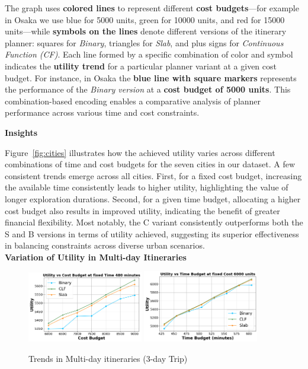 \noindent The graph uses \textbf{colored lines} to represent different \textbf{cost budgets}—for example in Osaka we use blue for 5000 units, green for 10000 units, and red for 15000 units—while \textbf{symbols on the lines} denote different versions of the itinerary planner: squares for \textit{Binary}, triangles for \textit{Slab}, and plus signs for \textit{Continuous Function (CF)}. Each line formed by a specific combination of color and symbol indicates the \textbf{utility trend} for a particular planner variant at a given cost budget. For instance, in Osaka the \textbf{blue line with square markers} represents the performance of the \textit{Binary version} at a \textbf{cost budget of 5000 units}. This combination-based encoding enables a comparative analysis of planner performance across various time and cost constraints.

\noindent\textbf{Insights}

\noindent Figure~\ref{fig:cities} illustrates how the achieved utility varies across different combinations of time and cost budgets for the seven cities in our dataset. A few consistent trends emerge across all cities. First, for a fixed cost budget, increasing the available time consistently leads to higher utility, highlighting the value of longer exploration durations. Second, for a given time budget, allocating a higher cost budget also results in improved utility, indicating the benefit of greater financial flexibility. Most notably, the C variant consistently outperforms both the S and B versions in terms of utility achieved, suggesting its superior effectiveness in balancing constraints across diverse urban scenarios.\\

\noindent\textbf{Variation of Utility in Multi-day Itineraries}
\begin{figure}[H]
\includegraphics[width=0.45\textwidth]{plots/multiday1_pkj.png}
\includegraphics[width=0.45\textwidth]{plots/multiday2_pkj.png}
\caption{Trends in Multi-day itineraries (3-day Trip)}
\label{fig:util_md}
\end{figure}

